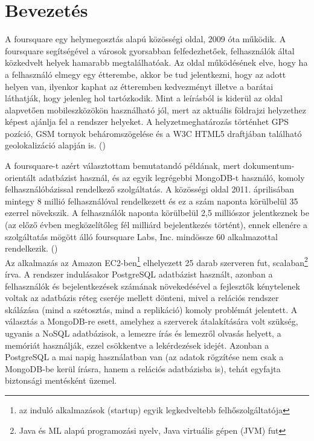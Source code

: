\section{Bevezetés}

A foursquare egy helymegosztás alapú közösségi oldal, 2009 óta működik. A foursquare segítségével a városok gyorsabban felfedezhetőek, felhasználók által közkedvelt helyek hamarabb megtalálhatóak. Az oldal működésének elve, hogy ha a felhasználó elmegy egy étterembe, akkor be tud jelentkezni, hogy az adott helyen van, ilyenkor kaphat az étteremben kedvezményt illetve a barátai láthatják, hogy jelenleg hol tartózkodik. Mint a leírásból is kiderül az oldal alapvetően mobileszközökön használható jól, mert az aktuális földrajzi helyzethez képest ajánlja fel a rendszer helyeket. A helyzetmeghatározás történhet GPS pozíció, GSM tornyok beháromszögelése és a W3C HTML5 draftjában található geolokalizáció alapján is. ()

A foursquare-t azért választottam bemutatandó példának, mert dokumentum-orientált adatbázist használ, és az egyik legrégebbi MongoDB-t használó, komoly felhasználóbázissal rendelkező szolgáltatás.
A közösségi oldal 2011. áprilisában mintegy 8 millió felhasználóval rendelkezett és ez a szám naponta körülbelül 35 ezerrel növekszik. A felhasználók naponta körülbelül 2,5 milliószor jelentkeznek be (az előző évben megközelítőleg fél milliárd bejelentkezés történt), ennek ellenére a szolgáltatás mögött álló foursquare Labs, Inc. mindössze 60 alkalmazottal rendelkezik. ()
\\
Az alkalmazás az Amazon EC2-ben\footnote{az induló alkalmazások (startup) egyik legkedveltebb felhőszolgáltatója} elhelyezett 25 darab szerveren fut, scalaban\footnote{Java és ML alapú programozási nyelv, Java virtuális gépen (JVM) fut} írva.
A rendszer indulásakor PostgreSQL adatbázist használt, azonban a felhasználók és bejelentkezések számának növekedésével a fejlesztők kénytelenek voltak az adatbázis réteg cseréje mellett dönteni, mivel a relációs rendszer skálázása (mind a szétosztás, mind a replikáció) komoly problémát jelentett. A választás a MongoDB-re esett, amelyhez a szerverek átalakítására volt szükség, ugyanis a NoSQL adatbázisok, a lemezre írás és lemezről olvasás helyett, a memóriát használják, ezzel csökkentve a lekérdezések idejét. Azonban a PostgreSQL a mai napig használatban van (az adatok rögzítése nem csak a MongoDB-be kerül írásra, hanem a relációs adatbázisba is), tehát egyfajta biztonsági mentésként üzemel.

